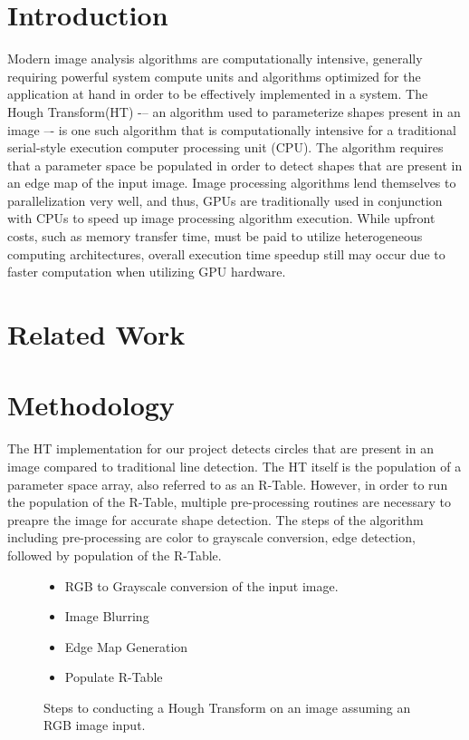 \documentclass[conference]{IEEEtran}
\begin{document}
\section{Introduction}
Modern image analysis algorithms are computationally intensive, generally requiring powerful system compute units and algorithms optimized for the application at hand in order to be effectively implemented in a system. 
The Hough Transform(HT)\cite{BALLARD1981111} -– an algorithm used to parameterize shapes present in an image –- is one such algorithm that is computationally intensive for a traditional serial-style execution computer processing unit (CPU).
The algorithm requires that a parameter space be populated in order to detect shapes that are present in an edge map of the input image.
Image processing algorithms lend themselves to parallelization very well, and thus, GPUs are traditionally used in conjunction with CPUs to speed up image processing algorithm execution.
While upfront costs, such as memory transfer time, must be paid to utilize heterogeneous computing architectures, overall execution time speedup still may occur due to faster computation when utilizing GPU hardware.




\section{Related Work}


\section{Methodology}
The HT implementation for our project detects circles that are present in an image compared to traditional line detection.
The HT itself is the population of a parameter space array, also referred to as an R-Table.
However, in order to run the population of the R-Table, multiple pre-processing routines are necessary to preapre the image for accurate shape detection.
The steps of the algorithm including pre-processing are color to grayscale conversion, edge detection, followed by population of the R-Table.


\begin{figure}[h]
  \begin{itemize}
    \item RGB to Grayscale conversion of the input image.
    \item Image Blurring 
    \item Edge Map Generation
    \item Populate R-Table
  \end{itemize}\caption{Steps to conducting a Hough Transform on an image assuming an RGB image input.}\label{figure:hough-transform-steps}
\end{figure}
\end{document}
